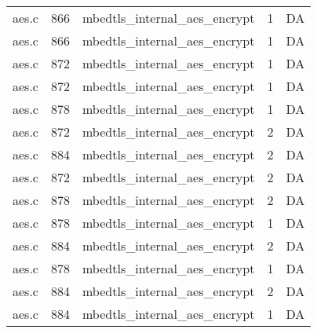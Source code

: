 \begin{table}[h!]
\begin{tabular}{lrlrr}
aes.c& 866&mbedtls\_internal\_aes\_encrypt&1 &DA\\
aes.c& 866&mbedtls\_internal\_aes\_encrypt&1 &DA\\
aes.c& 872&mbedtls\_internal\_aes\_encrypt&1 &DA\\
aes.c& 872&mbedtls\_internal\_aes\_encrypt&1 &DA\\
aes.c& 878&mbedtls\_internal\_aes\_encrypt&1 &DA\\
aes.c& 872&mbedtls\_internal\_aes\_encrypt&2 &DA\\
aes.c& 884&mbedtls\_internal\_aes\_encrypt&2 &DA\\
aes.c& 872&mbedtls\_internal\_aes\_encrypt&2 &DA\\
aes.c& 878&mbedtls\_internal\_aes\_encrypt&2 &DA\\
aes.c& 878&mbedtls\_internal\_aes\_encrypt&1 &DA\\
aes.c& 884&mbedtls\_internal\_aes\_encrypt&2 &DA\\
aes.c& 878&mbedtls\_internal\_aes\_encrypt&1 &DA\\
aes.c& 884&mbedtls\_internal\_aes\_encrypt&2 &DA\\
aes.c& 884&mbedtls\_internal\_aes\_encrypt&1 &DA\\
\hline
\end{tabular}
\renewcommand{\baselinestretch}{1.0}\selectfont
\end{table}
